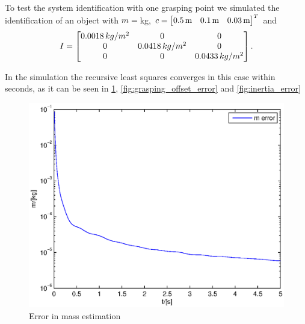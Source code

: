 To test the system identification with one grasping point we simulated the identification of an object with $m = $\unit[2]{kg}, $c = \begin{bmatrix} \text{\unit[0.5]{m}} & \text{\unit[0.1]{m}} & \text{\unit[0.03]{m}} \end{bmatrix}^T$ and 
\begin{equation*}
	I = \begin{bmatrix} \text{\unit[0.0018]{$kg/m^2$}} & 0 & 0 \\ 0 & \text{\unit[0.0418]{$kg/m^2$}} & 0 \\ 0 & 0 & \text{\unit[0.0433]{$kg/m^2$}} \end{bmatrix}.
\end{equation*}

In the simulation the recursive least squares converges in this case within seconds, as it can be seen in \ref{fig:mass_error}, \ref{fig:grasping_offset_error} and \ref{fig:inertia_error}

\begin{figure}
	\centering
	\includegraphics[scale=.7]{figures/mass_error.eps}
	\caption{Error in mass estimation}
	\label{fig:mass_error}
\end{figure}

